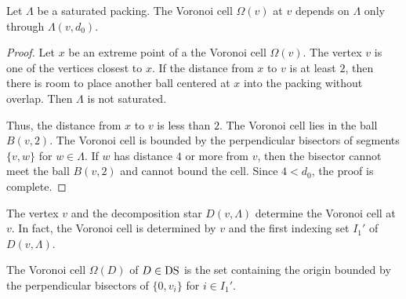 


\begin{lemma}
Let $\Lambda$ be a saturated packing. The Voronoi cell $\Omega(v)$
at $v$ depends on $\Lambda$ only through $\Lambda(v,d_0)$.
\end{lemma}

\begin{proof}  Let $x$ be an extreme point of a the Voronoi cell
$\Omega(v)$.  The vertex $v$ is one of the vertices closest to
$x$.  If the distance from $x$ to $v$ is at least $2$, then there
is room to place another ball centered at $x$ into the packing
without overlap.  Then $\Lambda$ is not saturated.

Thus, the distance from $x$ to $v$ is less than $2$.  The Voronoi
cell lies in the ball $B(v,2)$.  The Voronoi cell is bounded by
the perpendicular bisectors of segments $\{v,w\}$ for
$w\in\Lambda$. If $w$ has distance $4$ or more from $v$, then the
bisector cannot meet the ball $B(v,2)$ and cannot bound the cell.
Since $4<d_0$, the proof is complete.
\end{proof}

\begin{corollary} \label{lemma:vor}
The vertex $v$ and the decomposition star $D(v,\Lambda)$ determine
the Voronoi cell at $v$.  In fact, the Voronoi cell is determined
by $v$ and the first indexing set $I_1'$ of $D(v,\Lambda)$.
\end{corollary}

\begin{definition} The Voronoi cell $\Omega(D)$ of $D\in{\operatorname{DS}}$
is the set containing the origin bounded by the perpendicular
bisectors of $\{0,v_i\}$ for $i\in I_1'$.
\end{definition}

